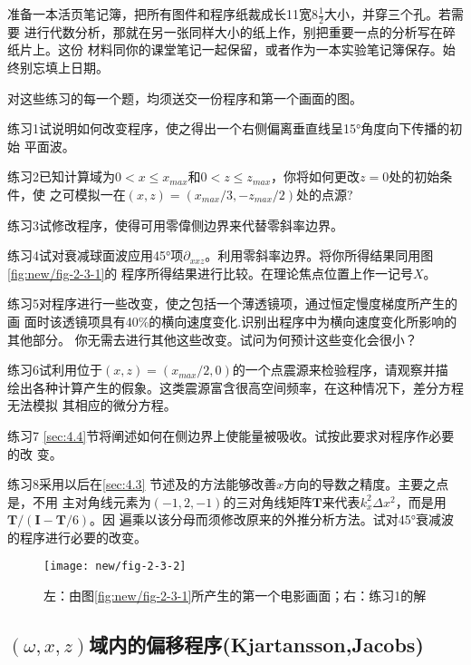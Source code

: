 准备一本活页笔记簿，把所有图件和程序纸裁成长11宽$8\frac{1}{2}$大小，并穿三个孔。若需要
进行代数分析，那就在另一张同样大小的纸上作，别把重要一点的分析写在碎纸片上。这份
材料同你的课堂笔记一起保留，或者作为一本实验笔记簿保存。始终别忘填上日期。

对这些练习的每一个题，均须送交一份程序和第一个画面的图。

练习1试说明如何改变程序，使之得出一个右侧偏离垂直线呈15°角度向下传播的初始
平面波。

练习2已知计算域为$0<x\leq x_{max}$和$0<z\leq z_{max}$，你将如何更改$z=0$处的初始条件，使
之可模拟一在$(x,z) =(x_{max}/3,-z_{max}/2)$处的点源?

练习3试修改程序，使得可用零偉侧边界来代替零斜率边界。

练习4试对衰减球面波应用45°项$\partial _{xxz}$。利用零斜率边界。将你所得结果同用图\ref{fig:new/fig-2-3-1}的
程序所得结果进行比较。在理论焦点位置上作一记号$X$。

练习5对程序进行一些改变，使之包括一个薄透镜项，通过恒定慢度梯度所产生的画
面时该透镜项具有40\%的横向速度变化.识别出程序中为横向速度变化所影响的其他部分。
你无需去进行其他这些改变。试问为何预计这些变化会很小？

练习6试利用位于$(x,z)=(x_{max}/2,0)$的一个点震源来检验程序，请观察并描
绘出各种计算产生的假象。这类震源富含很高空间频率，在这种情况下，差分方程无法模拟
其相应的微分方程。

练习7 \ref{sec:4.4}节将阐述如何在侧边界上使能量被吸收。试按此要求对程序作必要的改 变。

练习8采用以后在\ref{sec:4.3}
节述及的方法能够改善$x$方向的导数之精度。主要之点是，不用
主对角线元素为$(-1,2,-1)$的三对角线矩阵$\mathbf{T}$来代表$k_x^2\Delta x^2$，而是用$\mathbf{T}/(\mathbf{I}-\mathbf{T}/6)$。因
遍乘以该分母而须修改原来的外推分析方法。试对45°衰减波的程序进行必要的改变。
\begin{figure}[H]
\centering
\texttt{[image: new/fig-2-3-2]}
\caption[2-3-2]{左：由图\ref{fig:new/fig-2-3-1}所产生的第一个电影画面；右：练习1的解}
\label{fig:new/fig-2-3-2}
\end{figure}

\subsection{$(\omega,x,z)$域内的偏移程序(Kjartansson,Jacobs)}
